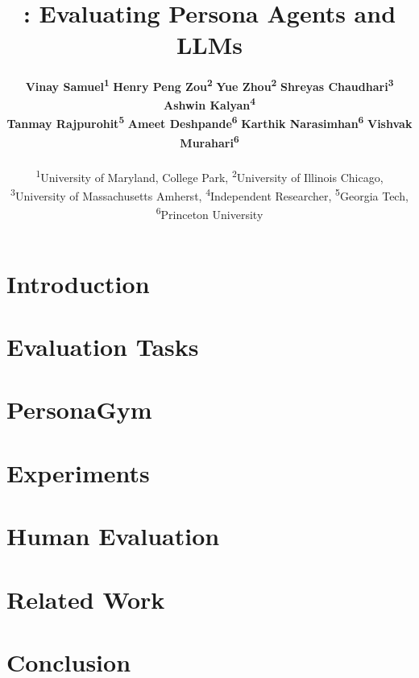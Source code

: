 \documentclass[11pt]{article}
\title{\benchmark: Evaluating Persona Agents and LLMs}
\author{
 \textbf{Vinay Samuel\textsuperscript{1}} \quad
 \textbf{Henry Peng Zou\textsuperscript{2}} \quad
 \textbf{Yue Zhou\textsuperscript{2}} \quad
 \textbf{Shreyas Chaudhari\textsuperscript{3}} \quad
 \textbf{Ashwin Kalyan\textsuperscript{4}}
 \\
 \textbf{Tanmay Rajpurohit\textsuperscript{5}} \quad
 \textbf{Ameet Deshpande\textsuperscript{6}} \quad
 \textbf{Karthik Narasimhan\textsuperscript{6}} \quad
 \textbf{Vishvak Murahari\textsuperscript{6}}
\\ \\
 \textsuperscript{1}University of Maryland, College Park,
 \textsuperscript{2}University of Illinois Chicago,\\
 \textsuperscript{3}University of Massachusetts Amherst,
 \textsuperscript{4}Independent Researcher,
 \textsuperscript{5}Georgia Tech,
 \textsuperscript{6}Princeton University
\\
}
\newcommand{\benchmark}{PersonaGym\xspace}
\begin{document}
\maketitle
\begin{abstract}

\end{abstract}

%

\section{Introduction}



\section{Evaluation Tasks}
\label{sec:tasks}


\section{\benchmark}


\section{Experiments}


\section{Human Evaluation}


\section{Related Work}


\section{Conclusion}

\end{document}
